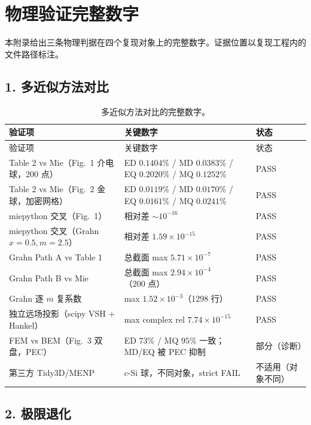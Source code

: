 \section{物理验证完整数字}

本附录给出三条物理判据在四个复现对象上的完整数字。证据位置以复现工程内的文件路径标注。

\subsection{1. 多近似方法对比}

\begin{longtable}{p{4.6cm}p{5.4cm}p{3.2cm}}
\caption{多近似方法对比的完整数字。}\label{tab:multi_method}\\
\toprule
验证项 & 关键数字 & 状态 \\
\midrule
\endfirsthead
\toprule
验证项 & 关键数字 & 状态 \\
\midrule
\endhead
Table 2 vs Mie（Fig.~1 介电球，200 点） & ED $0.1404\%$ / MD $0.0383\%$ / EQ $0.2020\%$ / MQ $0.1252\%$ & PASS \\
Table 2 vs Mie（Fig.~2 金球，加密网格） & ED $0.0119\%$ / MD $0.0170\%$ / EQ $0.0161\%$ / MQ $0.0241\%$ & PASS \\
miepython 交叉（Fig.~1） & 相对差 $\sim10^{-16}$ & PASS \\
miepython 交叉（Grahn $x=0.5,m=2.5$） & 相对差 $1.59\times10^{-15}$ & PASS \\
Grahn Path A vs Table 1 & 总截面 max $5.71\times10^{-7}$ & PASS \\
Grahn Path B vs Mie & 总截面 max $2.94\times10^{-4}$（200 点） & PASS \\
Grahn 逐 $m$ 复系数 & max $1.52\times10^{-3}$（1298 行） & PASS \\
独立远场投影（scipy VSH + Hankel） & max complex rel $7.74\times10^{-15}$ & PASS \\
FEM vs BEM（Fig.~3 双盘，PEC） & ED $73\%$ / MQ $95\%$ 一致；MD/EQ 被 PEC 抑制 & 部分（诊断） \\
第三方 Tidy3D/MENP & c-Si 球，不同对象，strict FAIL & 不适用（对象不同） \\
\bottomrule
\end{longtable}

\subsection{2. 极限退化}

